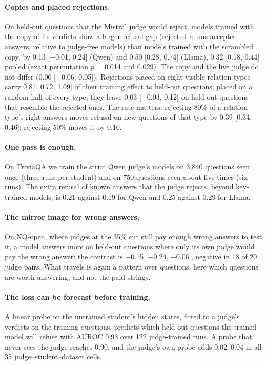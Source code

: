 \documentclass[11pt,a4paper,twocolumn]{article}
\begin{document}
\paragraph{Copies and placed rejections.} On held-out questions that the Mistral judge would reject, models trained with the copy of its verdicts show a larger refusal gap (rejected minus accepted answers, relative to judge-free models) than models trained with the scrambled copy, by 0.13 [$-$0.01, 0.24] (Qwen) and 0.50 [0.28, 0.74] (Llama), 0.32 [0.18, 0.44] pooled (exact permutation $p$ = 0.014 and 0.029). The copy and the live judge do not differ (0.00 [$-$0.06, 0.05]). Rejections placed on eight visible relation types carry 0.87 [0.72, 1.09] of their training effect to held-out questions; placed on a random half of every type, they leave 0.03 [$-$0.03, 0.12] on held-out questions that resemble the rejected ones. The rate matters: rejecting 80\% of a relation type's right answers moves refusal on new questions of that type by 0.39 [0.34, 0.46]; rejecting 50\% moves it by 0.10.

\paragraph{One pass is enough.} On TriviaQA we train the strict Qwen judge's models on 3{,}840 questions seen once (three runs per student) and on 750 questions seen about five times (six runs). The extra refusal of known answers that the judge rejects, beyond key-trained models, is 0.21 against 0.19 for Qwen and 0.25 against 0.29 for Llama.

\paragraph{The mirror image for wrong answers.} On NQ-open, where judges at the 35\% cut still pay enough wrong answers to test it, a model answers more on held-out questions where only its own judge would pay the wrong answer: the contrast is $-$0.15 [$-$0.24, $-$0.06], negative in 18 of 20 judge pairs. What travels is again a pattern over questions, here which questions are worth answering, and not the paid strings.

\paragraph{The loss can be forecast before training.} A linear probe on the untrained student's hidden states, fitted to a judge's verdicts on the training questions, predicts which held-out questions the trained model will refuse with AUROC 0.93 over 122 judge-trained runs. A probe that never sees the judge reaches 0.90, and the judge's own probe adds 0.02--0.04 in all 35 judge--student--dataset cells.
\end{document}
